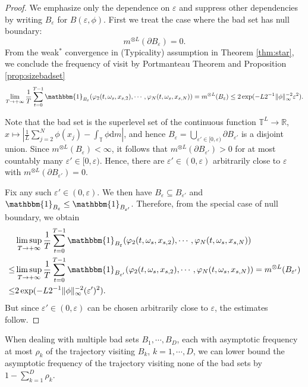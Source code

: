 \documentclass[a4paper]{article}
\theoremstyle{plain}
\theoremstyle{definition}
\newcommand{\R}{\mathbb{R}}
\newcommand{\T}{\mathbb{T}}
\newcommand{\One}{\mathbbm{1}}
\begin{document}
\begin{proof}
	We emphasize only the dependence on $\varepsilon$ and suppress other dependencies by writing $B_{\varepsilon}$ for $B(\varepsilon,\phi)$. First we treat the case where the bad set has null boundary:
	$$m^{\otimes L}(\partial B_{\varepsilon})=0.$$
	From the weak$^*$ convergence in (Typicality) assumption in Theorem \ref{thm:star}, we conclude the frequency of visit by Portmanteau Theorem and Proposition \ref{prop:sizebadset}
	$$\lim_{T\to+\infty} \frac{1}{T}\sum_{t=0}^{T-1} \One_{B_{\varepsilon}}  (\varphi_2(t,\omega_{s},x_{{s},2}),\cdots,\varphi_N(t,\omega_{s},x_{{s},N}) ) = m^{\otimes L}(B_{\varepsilon})\leq 2\exp(-L2^{-1}\|\phi\|_{\infty}^{-2} \varepsilon^2).$$
	
	Note that the bad set is the superlevel set of the continuous function $\T^L\to\R$, $x\mapsto \left|\frac{1}{L}\sum_{j=2}^N \phi(x_j) - \int_{\T}\phi\mathrm{d}m\right|$, and hence $B_{\varepsilon}= \bigcup_{\varepsilon'\in[0,\varepsilon)} \partial B_{\varepsilon'}$ is a disjoint union. Since $m^{\otimes L}(B_{\varepsilon})<\infty$, it follows that $m^{\otimes L}(\partial B_{\varepsilon'})>0$ for at most countably many $\varepsilon'\in[0,\varepsilon)$. Hence, there are $\varepsilon'\in(0,\varepsilon)$ arbitrarily close to $\varepsilon$ with $m^{\otimes L}(\partial B_{\varepsilon'})=0$.
	
	Fix any such $\varepsilon'\in(0, \varepsilon)$. We then have $B_{\varepsilon}\subseteq B_{\varepsilon'}$ and $\One_{B_{\varepsilon}}\leq \One_{B_{\varepsilon'}}$. Therefore, from the special case of null boundary, we obtain
	\begin{align*}
		&\limsup_{T\to+\infty} \frac{1}{T}\sum_{t=0}^{T-1} \One_{B_{\varepsilon}}  (\varphi_2(t,\omega_{{s}},x_{{s},2}),\cdots,\varphi_N(t,\omega_{{s}},x_{{s},N}) )  \\
		\leq& \limsup_{T\to+\infty} \frac{1}{T}\sum_{t=0}^{T-1} \One_{B_{\varepsilon'}}(\varphi_2(t,\omega_{{s}},x_{{s},2}),\cdots,\varphi_N(t,\omega_{{s}},x_{{s},N}) )= m^{\otimes L}(B_{\varepsilon'})\\
		\leq& 2\exp(-L2^{-1}\|\phi\|_{\infty}^{-2} (\varepsilon')^2).
	\end{align*}
	But since $\varepsilon'\in(0,\varepsilon)$ can be chosen arbitrarily close to $\varepsilon$, the estimates follow.
\end{proof}


When dealing with multiple bad sets $B_1,\cdots,B_D$, each with asymptotic frequency at most $\rho_k$ of the trajectory visiting $B_k$, $k=1,\cdots,D$, we can lower bound the asymptotic frequency of the trajectory visiting none of the bad sets by $ 1- \sum_{k=1}^D \rho_k$.
\end{document}

